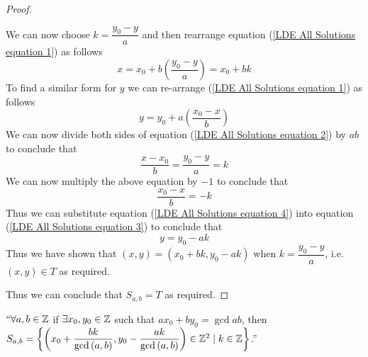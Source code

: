 \begin{proof}
\begin{itemize}
                    We can now choose $k = \dfrac{y_0 - y}{a}$ and then rearrange equation 
                    (\ref{LDE All Solutions equation 1}) as follows
                    \[
                        x = x_0 + b\left(\frac{y_0 - y}{a}\right) = x_0 + bk
                    \]
                    To find a similar form for $y$ we can re-arrange (\ref{LDE All Solutions equation 1})
                    as follows
                    \begin{equation}
                        y = y_0 + a\left(\frac{x_0 - x}{b}\right)
                        \label{LDE All Solutions equation 3}
                    \end{equation}
                    We can now divide both sides of equation (\ref{LDE All Solutions equation 2}) by
                    $ab$ to conclude that
                    \[
                        \frac{x - x_0}{b} = \frac{y_0 - y}{a} = k
                    \]
                    We can now multiply the above equation by $-1$ to conclude that
                    \begin{equation}
                        \frac{x_0 - x}{b} = -k 
                        \label{LDE All Solutions equation 4}
                    \end{equation}
                    Thus we can substitute equation (\ref{LDE All Solutions equation 4}) into
                    equation (\ref{LDE All Solutions equation 3}) to conclude that
                    \[
                        y = y_0 - ak
                    \]
                    Thus we have shown that $(x, y) = (x_0 + bk, y_0 - ak)$ when $k = \dfrac{y_0 - y}{a}$,
                    i.e. $(x, y) \in T$ as required.
            \end{itemize} 
           Thus we can conclude that $S_{a, b} = T$ as required. \QED
        \end{proof}
        \begin{theorem}
            $``\forall a, b \in \mathbb{Z}$ if $\exists x_0, y_0 \in \mathbb{Z}$ such that
            $ax_0 + by_0 = \gcd{a}{b}$, then  $S_{a, b} =
            \left\{\left(x_0 + \dfrac{bk}{\mathrm{gcd}\left(a, b\right)}, y_0 - \dfrac{ak}{\mathrm{gcd}\left(a, b\right)}\right) \in \mathbb{Z}^2 \mid
            k \in \mathbb{Z}\right\}$.''
        \end{theorem}
